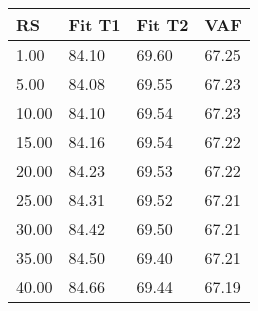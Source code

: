 \begin{tabular}{llll}
RS & Fit T1 & Fit T2 & VAF \\ 
\hline 
 1.00 & 84.10 & 69.60 & 67.25 \\ 
 5.00 & 84.08 & 69.55 & 67.23 \\ 
10.00 & 84.10 & 69.54 & 67.23 \\ 
15.00 & 84.16 & 69.54 & 67.22 \\ 
20.00 & 84.23 & 69.53 & 67.22 \\ 
25.00 & 84.31 & 69.52 & 67.21 \\ 
30.00 & 84.42 & 69.50 & 67.21 \\ 
35.00 & 84.50 & 69.40 & 67.21 \\ 
40.00 & 84.66 & 69.44 & 67.19 \\ 
\hline 
\end{tabular}